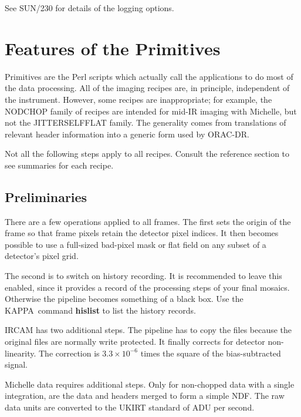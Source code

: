 \documentclass[twoside,11pt]{article}
\newcommand{\htmlref}[2]{#1}
\newcommand{\xref}[3]{#1}
\newcommand{\xlabel}[1]{}
\renewcommand{\_}{\texttt{\symbol{95}}}
\newcommand{\KAPPA}{{\footnotesize KAPPA}}
\newcommand{\ORACDR}{{\footnotesize ORAC-DR}}
\begin{document}
See \xref{SUN/230}{sun230}{windows_and_output} for details of the
logging options.

\section{\xlabel{features_of_the_primitives}Features of the
Primitives\label{features_of_the_primitives}}

Primitives are the Perl scripts which actually call the applications
to do most of the data processing.  All of the imaging recipes are, in
principle, independent of the instrument.  However, some recipes are
inappropriate; for example, the NOD\_CHOP family of recipes are
intended for mid-IR imaging with Michelle, but not the
\htmlref{JITTER\_SELF\_FLAT}{JITTER\_SELF\_FLAT} family.  The generality
comes from translations of relevant header information into a generic
form used by \ORACDR.

Not all the following steps apply to all recipes.  Consult the
\htmlref{reference section}{recipes} to see summaries for each recipe.

\subsection{\xlabel{preliminaries}Preliminaries\label{preliminaries}}

There are a few operations applied to all frames.  The first sets the
origin of the frame so that frame pixels retain the detector pixel
indices.  It then becomes possible to use a full-sized bad-pixel mask
or flat field on any subset of a detector's pixel grid.

The second is to switch on history recording.  It is recommended to
leave this enabled, since it provides a record of the processing steps
of your final mosaics.  Otherwise the pipeline becomes something of 
a black box.  Use the \KAPPA\ command
\xref{{\bf hislist}}{sun95}{HISLIST} to list the history records.

IRCAM has two additional steps.  The pipeline has to copy the files
because the original files are normally write protected.  It finally
corrects for detector non-linearity.  The correction is $3.3\times10^{-6}$
times the square of the bias-subtracted signal. 

Michelle data requires additional steps.  Only for non-chopped data with
a single integration, are the data and headers merged to form a simple
NDF.   The raw data units are converted to the UKIRT standard of ADU
per second.  
\end{document}
